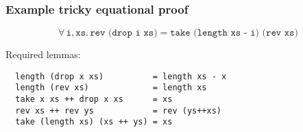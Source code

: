 \documentclass[serif,professionalfont]{beamer}
\newcommand\faa[2]{ \forall \, #1 , #2 . \,}
\newcommand\dn[0]{\vspace{\baselineskip}}
\newcommand\hs[1]{\texttt{#1}}
\newcommand\xs[0]{\hs{xs}}
\begin{document}
\begin{frame}[fragile]
  \frametitle{Example tricky equational proof}

  \begin{equation*}
      \faa{\hs{i}}{\xs} \hs{rev (drop i xs)} = \hs{take (length xs - i) (rev xs)}
  \end{equation*}

  \pause

  \dn

  Required lemmas:

  \begin{center}
  \begin{verbatim}
  length (drop x xs)          = length xs - x
  length (rev xs)             = length xs
  take x xs ++ drop x xs      = xs
  rev xs ++ rev ys            = rev (ys++xs)
  take (length xs) (xs ++ ys) = xs
  \end{verbatim}
  \end{center}

  \begin{comment}
  \pause

  \begin{align*}
  & \hspace{-2em} \small \hs{rev (drop i xs)}                                                   & \small = \left\{ 5 \right\} \\[-3pt]
  & \hspace{-2em} \small \hs{take (len (rev (drop i xs))) (rev (drop i xs)++rev (take i xs))}   & \small = \left\{ 2 \right\} \\[-3pt]
  & \hspace{-2em} \small \hs{take (len (drop i xs)) (rev (drop i xs)++rev (take i xs))}         & \small = \left\{ 1 \right\} \\[-3pt]
  & \hspace{-2em} \small \hs{take (len xs-i) (rev (drop i xs)++rev (take i xs))}                & \small = \left\{ 4 \right\} \\[-3pt]
  & \hspace{-2em} \small \hs{take (len xs-i) (rev (take i xs++drop i xs))}                      & \small = \left\{ 3 \right\} \\[-3pt]
  & \hspace{-2em} \small \hs{take (len xs-i) (rev xs)}
  \end{align*}
  \end{comment}
\end{frame}

\end{document}
